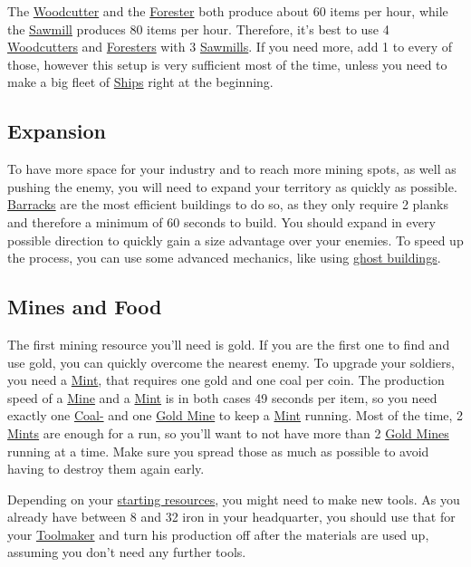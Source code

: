 \documentclass[11pt]{article}
\begin{document}
The \hyperref[woodcutter]{Woodcutter} and the \hyperref[forester]{Forester} both produce about 60 items per hour, while the \hyperref[sawmill]{Sawmill} produces 80 items per hour. Therefore, it's best to use 4 \hyperref[woodcutter]{Woodcutters} and \hyperref[forester]{Foresters} with 3 \hyperref[sawmill]{Sawmills}. If you need more, add 1 to every of those, however this setup is very sufficient most of the time, unless you need to make a big fleet of \hyperref[ship]{Ships} right at the beginning.

\subsection{Expansion}
\label{sec:expansion}

To have more space for your industry and to reach more mining spots, as well as pushing the enemy, you will need to expand your territory as quickly as possible. \hyperref[barrack]{Barracks} are the most efficient buildings to do so, as they only require 2 planks and therefore a minimum of 60 seconds to build. You should expand in every possible direction to quickly gain a size advantage over your enemies. To speed up the process, you can use some advanced mechanics, like using \hyperref[ghostbuildings]{ghost buildings}.

\subsection{Mines and Food}
\label{sec:minesandfoot}

The first mining resource you'll need is gold. If you are the first one to find and use gold, you can quickly overcome the nearest enemy. To upgrade your soldiers, you need a \hyperref[mint]{Mint}, that requires one gold and one coal per coin. The production speed of a \hyperref[mine]{Mine} and a \hyperref[mint]{Mint} is in both cases 49 seconds per item, so you need exactly one \hyperref[coalmine]{Coal-} and one \hyperref[goldmine]{Gold Mine} to keep a \hyperref[mint]{Mint} running. Most of the time, 2 \hyperref[mint]{Mints} are enough for a run, so you'll want to not have more than 2 \hyperref[goldmine]{Gold Mines} running at a time. Make sure you spread those as much as possible to avoid having to destroy them again early.

Depending on your \hyperref[startresources]{starting resources}, you might need to make new tools. As you already have between 8 and 32 iron in your headquarter, you should use that for your \hyperref[toolmaker]{Toolmaker} and turn his production off after the materials are used up, assuming you don't need any further tools.
\end{document}
